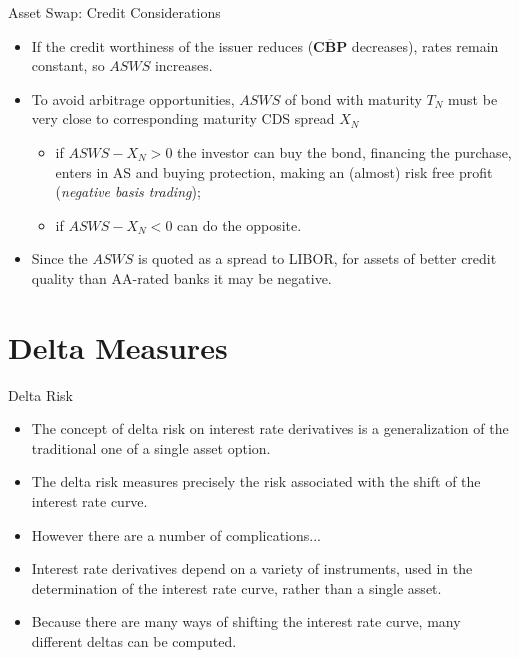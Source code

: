 \documentclass{beamer}
\begin{document}
\begin{frame}{Asset Swap: Credit Considerations}
	\begin{itemize}
		\item If the credit worthiness of the issuer reduces ($\overline{\textbf{CBP}}$ decreases), rates remain constant, so $ASWS$ increases.
		\item To avoid arbitrage opportunities, $ASWS$ of bond with maturity $T_N$ must be very close to corresponding maturity CDS spread $X_N$
		\begin{itemize}
			\item if $ASWS - X_N > 0$ the investor can buy the bond, financing the purchase, enters in AS and buying protection, making an (almost) risk free profit (\emph{negative basis trading});
			\item if $ASWS - X_N < 0$ can do the opposite.
		\end{itemize}
		\item Since the $ASWS$ is quoted as a spread to LIBOR, for assets of better credit quality than AA-rated banks it may be negative.
	\end{itemize}
\end{frame}

\section{Delta Measures}

\begin{frame}{Delta Risk}
	\begin{itemize}
	\item<1-> The concept of delta risk on interest rate derivatives is a generalization of the traditional one of a single asset option. 
	\item<2-> The delta risk measures precisely the risk associated with the shift of the interest rate curve. 
	\item<3-> However there are a number of complications...
	\item<4-> Interest rate derivatives depend on a variety of instruments, used in the determination of the interest rate curve, rather than a single asset.
	\item<5-> Because there are many ways of shifting the interest rate curve, many different deltas can be computed. 
	\end{itemize}
\end{frame}
\end{document}
